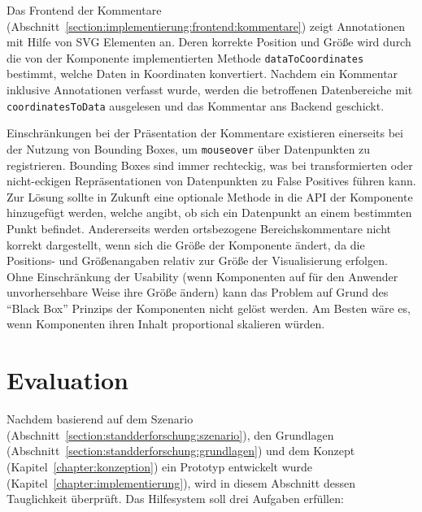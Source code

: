\documentclass[
	headsepline,
	footsepline,
	fontsize=12pt,
	bibliography=totoc
]{scrbook}
\begin{document}

Das Frontend der Kommentare (Abschnitt~\ref{section:implementierung:frontend:kommentare}) zeigt Annotationen mit Hilfe von SVG Elementen an. Deren korrekte Position und Größe wird durch die von der Komponente implementierten Methode \texttt{dataToCoordinates} bestimmt, welche Daten in Koordinaten konvertiert. Nachdem ein Kommentar inklusive Annotationen verfasst wurde, werden die betroffenen Datenbereiche mit \texttt{coordinatesToData} ausgelesen und das Kommentar ans Backend geschickt.


Einschränkungen bei der Präsentation der Kommentare existieren einerseits bei der Nutzung von Bounding Boxes, um \texttt{mouseover} über Datenpunkten zu registrieren. Bounding Boxes sind immer rechteckig, was bei transformierten oder nicht-eckigen Repräsentationen von Datenpunkten zu False Positives führen kann. Zur Lösung sollte in Zukunft eine optionale Methode in die API der Komponente hinzugefügt werden, welche angibt, ob sich ein Datenpunkt an einem bestimmten Punkt befindet. Andererseits werden ortsbezogene Bereichskommentare nicht korrekt dargestellt, wenn sich die Größe der Komponente ändert, da die Positions- und Größenangaben relativ zur Größe der Visualisierung erfolgen. Ohne Einschränkung der Usability (wenn Komponenten auf für den Anwender unvorhersehbare Weise ihre Größe ändern) kann das Problem auf Grund des \enquote{Black Box} Prinzips der Komponenten nicht gelöst werden. Am Besten wäre es, wenn Komponenten ihren Inhalt proportional skalieren würden.


\chapter{Evaluation}
\label{chapter:evaluation}

Nachdem basierend auf dem Szenario (Abschnitt~\ref{section:standderforschung:szenario}), den Grundlagen (Abschnitt~\ref{section:standderforschung:grundlagen}) und dem Konzept (Kapitel~\ref{chapter:konzeption}) ein Prototyp entwickelt wurde (Kapitel~\ref{chapter:implementierung}), wird in diesem Abschnitt dessen Tauglichkeit überprüft. Das Hilfesystem soll drei Aufgaben erfüllen:
\end{document}
